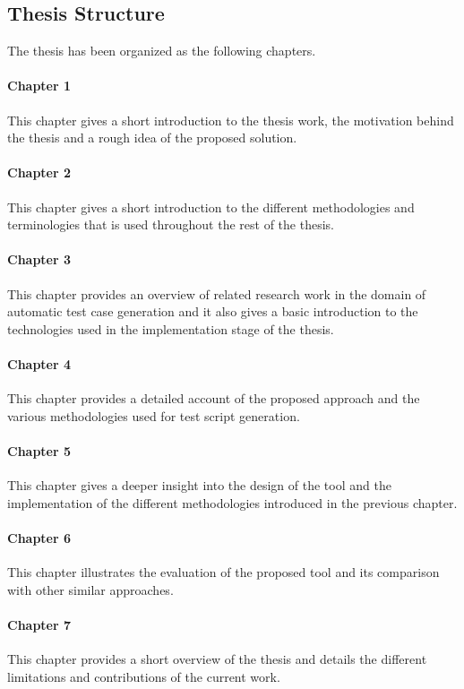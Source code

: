 \subsection{Thesis Structure}
The thesis has been organized as the following chapters.
\paragraph{Chapter 1} This chapter gives a short introduction to the thesis work, the motivation behind the thesis and a rough idea of the proposed solution.
\paragraph{Chapter 2} This chapter gives a short introduction to the different methodologies and terminologies that is used throughout the rest of the thesis.
\paragraph{Chapter 3} This chapter provides an overview of related research work in the domain of automatic test case generation and it also gives a basic introduction to the technologies used in the implementation stage of the thesis.
\paragraph{Chapter 4} This chapter provides a detailed account of the proposed approach and the various methodologies used for test script generation.
\paragraph{Chapter 5} This chapter gives a deeper insight into the design of the tool and the implementation of the different methodologies introduced in the previous chapter.
\paragraph{Chapter 6} This chapter illustrates the evaluation of the proposed tool and its comparison with other similar approaches.
\paragraph{Chapter 7} This chapter provides a short overview of the thesis and details the different limitations and contributions of the current work.